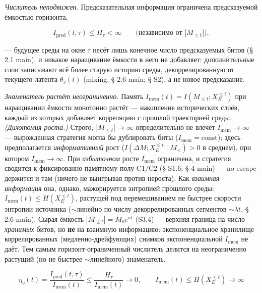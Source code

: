 \documentclass[12pt]{iopart}
\begin{document}
\emph{Числитель неподвижен.} Предсказательная информация ограничена предсказуемой ёмкостью горизонта,



\begin{equation}I_{\text{pred}}(t,\tau) \le H_\tau < \infty \qquad\text{(независимо от }|M_{\le t}|\text{)}, \tag{S3.5}\end{equation}



--- будущее среды на окне \(\tau\) несёт лишь конечное число предсказуемых битов (§ 2.1 main), и никакое наращивание ёмкости в него не добавляет: дополнительные слои записывают всё более старую историю среды, декоррелированную от текущего латента \(\theta_v(t)\) (mixing, § 2.6 main; § S2), а не новое предсказание.



\emph{Знаменатель растёт неограниченно.} Память \(I_{\text{mem}}(t) = I(M_{\le t}; X_E^{\le t})\) при наращивании ёмкости монотонно растёт --- накопление исторических слоёв, каждый из которых добавляет корреляцию с прошлой траекторией среды. \emph{(Дихотомия роста.)} Строго, \(|M_{\le t}|\to\infty\) определительно не влечёт \(I_{\text{mem}}\to\infty\) --- вырожденная стратегия могла бы дублировать биты (\(I_{\text{mem}} = \text{const}\)); здесь предполагается \emph{информативный} рост (\(I(\Delta M; X_E^{\le t}\mid M_{<}) > 0\) в среднем), при котором \(I_{\text{mem}}\to\infty\). При \emph{избыточном} росте \(I_{\text{mem}}\) ограничена, и стратегия сводится к фиксированно-памятному полу C1/C2 (§ S1.6; § 4 main) --- no-escape держится и там (ничего не выигрывая против нероста). Как \emph{взаимная информация} она, однако, мажорируется энтропией прошлого среды: \(I_{\text{mem}}(t) \le H(X_E^{\le t})\), растущей под перемешиванием не быстрее скорости энтропии источника (\(\sim\)линейно по числу декоррелированных сегментов \(\sim\lambda t\), § 2.6 main). Сырая ёмкость \(|M_{\le t}| = M_0 e^{\kappa t}\) (S3.4) --- верхняя граница на число \emph{хранимых} битов, но \textbf{не} на взаимную информацию: экспоненциальное хранилище коррелированных (медленно-дрейфующих) снимков экспоненциальной \(I_{\text{mem}}\) не даёт. Тем самым горизонт-ограниченный числитель делится на неограниченно растущий (но не быстрее \(\sim\)линейного) знаменатель,



\begin{equation}\eta_v(t) = \frac{I_{\text{pred}}(t,\tau)}{I_{\text{mem}}(t)} \le \frac{H_\tau}{I_{\text{mem}}(t)} \to 0, \qquad I_{\text{mem}}(t) \le H(X_E^{\le t}) \to \infty \tag{S3.6}\end{equation}
\end{document}
